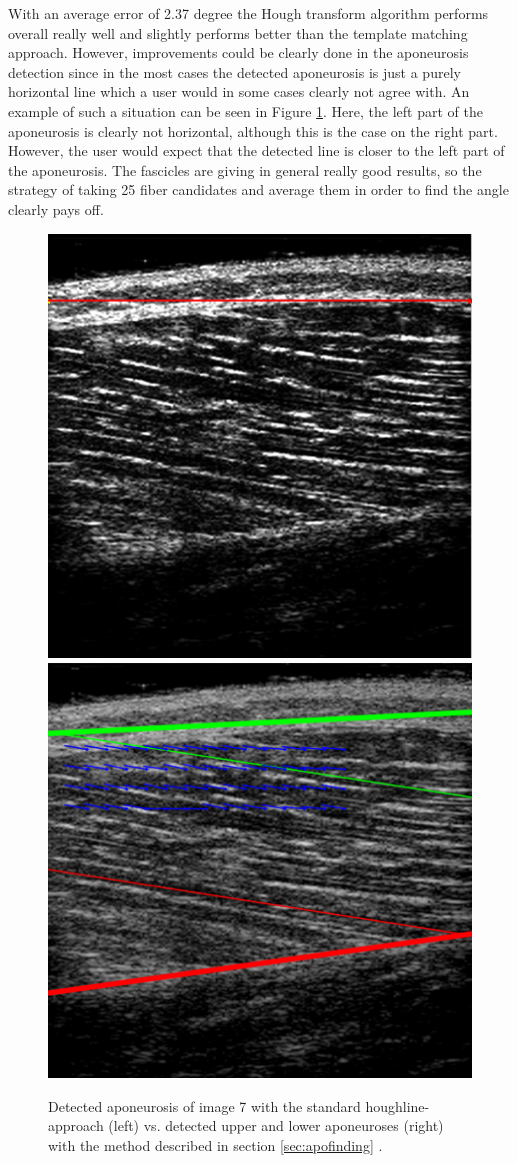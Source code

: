 \documentclass[10pt,twocolumn,letterpaper]{article}
\begin{document}
With an average error of 2.37 degree the Hough transform algorithm performs overall really well and slightly performs better than the template matching approach. 
However, improvements could be clearly done in the aponeurosis detection since in the most cases the detected aponeurosis is just a purely horizontal line which a user would in some cases clearly not agree with. An example of such a situation can be seen in Figure \ref{fig:im7_hough_apo}. Here, the left part of the aponeurosis is clearly not horizontal, although this is the case on the right part. However, the user would expect that the detected line is closer to the left part of the aponeurosis.
The fascicles are giving in general really good results, so the strategy of taking 25 fiber candidates and average them in order to find the angle clearly pays off.

\begin{figure}
	\begin{center}		
		\includegraphics[width=0.45\linewidth]{img/im7_hough_apo}
		\includegraphics[width=0.45\linewidth]{img/im7_apo_ela}
	\end{center}
	\caption{Detected aponeurosis of image 7 with the standard houghline-approach (left) vs. detected upper and lower aponeuroses (right) with the method described in section \ref{sec:apofinding}  .}
	\label{fig:im7_hough_apo}
	
\end{figure}
\end{document}
